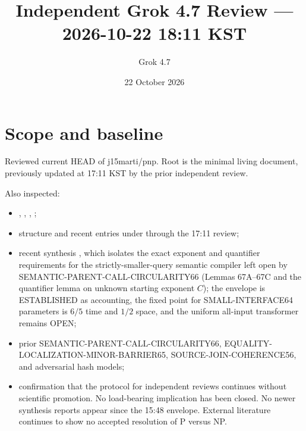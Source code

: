 \documentclass[11pt]{article}
\title{Independent Grok 4.7 Review --- 2026-10-22 18:11 KST}
\author{Grok 4.7}
\date{22 October 2026}
\begin{document}
\maketitle

\begin{center}
\end{center}

\section{Scope and baseline}
Reviewed current HEAD of j15marti/pnp. Root  is the minimal living document, previously updated at 17:11 KST by the prior independent review.

Also inspected:
\begin{itemize}
\item {}, , , ;
\item structure and recent entries under  through the 17:11 review;
\item recent synthesis , which isolates the exact exponent and quantifier requirements for the strictly-smaller-query semantic compiler left open by SEMANTIC-PARENT-CALL-CIRCULARITY66 (Lemmas 67A--67C and the quantifier lemma on unknown starting exponent $C$); the envelope is ESTABLISHED as accounting, the fixed point for SMALL-INTERFACE64 parameters is $6/5$ time and $1/2$ space, and the uniform all-input transformer remains OPEN;
\item prior SEMANTIC-PARENT-CALL-CIRCULARITY66, EQUALITY-LOCALIZATION-MINOR-BARRIER65, SOURCE-JOIN-COHERENCE56, and adversarial hash models;
\item confirmation that the protocol for independent reviews continues without scientific promotion. No load-bearing implication has been closed. No newer synthesis reports appear since the 15:48 envelope. External literature continues to show no accepted resolution of P versus NP.
\end{itemize}
\end{document}

